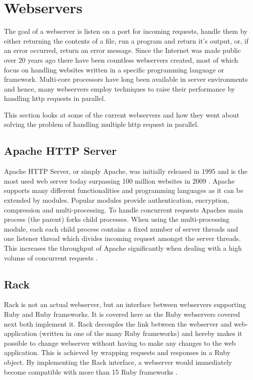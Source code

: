 \section{Webservers}
\label{webservers}

The goal of a webserver is listen on a port for incoming requests, handle them
by either returning the contents of a file, run a program and return it's
output, or, if an error occurred, return an error message. Since the Internet was
made public over 20 years ago there have been countless webservers created, most
of which focus on handling websites written in a specific programming language
or framework. Multi-core processors have long been available in server
environments and hence, many webservers employ techniques to raise their
performance by handling http requests in parallel.

This section looks at some of the current webservers and how they went about
solving the problem of handling multiple http request in parallel.

\subsection{Apache HTTP Server}
Apache HTTP Server, or simply Apache, was initially released in 1995 and is the
most used web server today surpassing 100 million websites in 2009
\cite{apachestats}. Apache supports many different functionalities and
programming languages as it can be extended by modules. Popular modules provide
authentication, encryption, compression and multi-processing. To handle
concurrent requests Apaches main process (the parent) forks child processes. 
When using the multi-processing module, each each child process contains a fixed 
number of server threads and one listener thread which divides incoming request
amongst the server threads. This increases the throughput of Apache
significantly when dealing with a high volume of concurrent requests
\cite{apachempm}.

\subsection{Rack}
Rack is not an actual webserver, but an interface between webservers supporting
Ruby and Ruby frameworks. It is covered here as the Ruby webservers covered next
both implement it. Rack decouples the link between the webserver and
web-application (written in one of the many Ruby frameworks) and hereby makes it
possible to change webserver without having to make any changes to the web
application. This is achieved by wrapping requests and responses in a Ruby
object. By implementing the Rack interface, a webserver would immediately become
compatible with more than 15 Ruby frameworks \cite{rackspec}.

